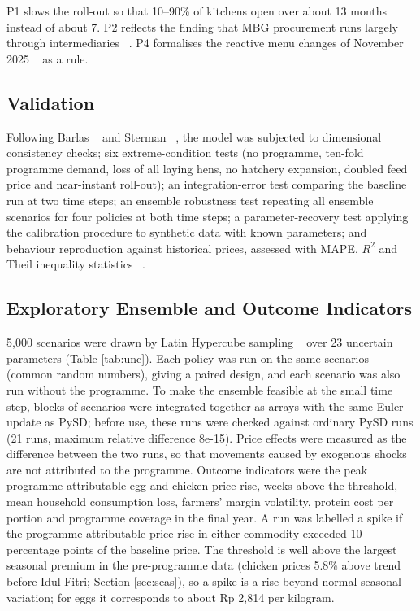 \documentclass[10pt,twocolumn,a4paper]{article}
\begin{document}
P1 slows the roll-out so that 10--90\% of kitchens open over about 13 months instead of about 7. P2 reflects the finding that MBG procurement runs largely through intermediaries ~\cite{ipb2026,ambarwati2025}. P4 formalises the reactive menu changes of November 2025 ~\cite{prabowo2025} as a rule.


\subsection{Validation}

Following Barlas ~\cite{barlas1996} and Sterman ~\cite{sterman2000}, the model was subjected to dimensional consistency checks; six extreme-condition tests (no programme, ten-fold programme demand, loss of all laying hens, no hatchery expansion, doubled feed price and near-instant roll-out); an integration-error test comparing the baseline run at two time steps; an ensemble robustness test repeating all ensemble scenarios for four policies at both time steps; a parameter-recovery test applying the calibration procedure to synthetic data with known parameters; and behaviour reproduction against historical prices, assessed with MAPE, $R^2$ and Theil inequality statistics ~\cite{sterman1984}.


\subsection{Exploratory Ensemble and Outcome Indicators}

5,000 scenarios were drawn by Latin Hypercube sampling ~\cite{mckay1979} over 23 uncertain parameters (Table \ref{tab:unc}). Each policy was run on the same scenarios (common random numbers), giving a paired design, and each scenario was also run without the programme. To make the ensemble feasible at the small time step, blocks of scenarios were integrated together as arrays with the same Euler update as PySD; before use, these runs were checked against ordinary PySD runs (21 runs, maximum relative difference 8e-15). Price effects were measured as the difference between the two runs, so that movements caused by exogenous shocks are not attributed to the programme. Outcome indicators were the peak programme-attributable egg and chicken price rise, weeks above the threshold, mean household consumption loss, farmers' margin volatility, protein cost per portion and programme coverage in the final year. A run was labelled a spike if the programme-attributable price rise in either commodity exceeded 10 percentage points of the baseline price. The threshold is well above the largest seasonal premium in the pre-programme data (chicken prices 5.8\% above trend before Idul Fitri; Section \ref{sec:seas}), so a spike is a rise beyond normal seasonal variation; for eggs it corresponds to about Rp 2,814 per kilogram.
\end{document}
